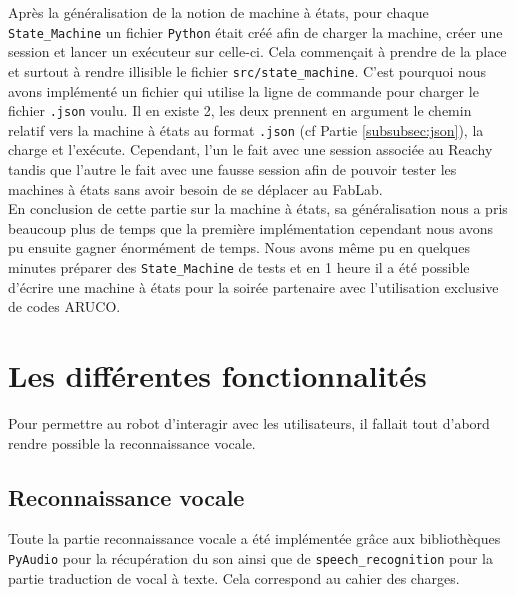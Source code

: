 \documentclass[a4paper,french]{article}
\begin{document}
Après la généralisation de la notion de machine à états, pour chaque \texttt{State\_Machine} un fichier \texttt{Python} était créé afin de charger la machine, créer une session et lancer un exécuteur sur celle-ci. Cela commençait à prendre de la place et surtout à rendre illisible le fichier \texttt{src/state\_machine}. C'est pourquoi nous avons implémenté un fichier qui utilise la ligne de commande pour charger le fichier \texttt{.json} voulu. Il en existe 2, les deux prennent en argument le chemin relatif vers la machine à états  au format \texttt{.json} (cf Partie \ref{subsubsec:json}), la charge et l'exécute. Cependant, l'un le fait avec une session associée au Reachy tandis que l'autre le fait avec une fausse session afin de pouvoir tester les machines à états sans avoir besoin de se déplacer au FabLab. \\

En conclusion de cette partie sur la machine à états, sa généralisation nous a pris beaucoup plus de temps que la première implémentation cependant nous avons pu ensuite gagner énormément de temps. Nous avons même pu en quelques minutes préparer des \texttt{State\_Machine} de tests et en 1 heure il a été possible d'écrire une machine à états pour la soirée partenaire avec l'utilisation exclusive de codes ARUCO.

\section{Les différentes fonctionnalités}
Pour permettre au robot d'interagir avec les utilisateurs, il fallait tout d'abord rendre possible la reconnaissance vocale.
\subsection{Reconnaissance vocale}

Toute la partie reconnaissance vocale a été implémentée grâce aux bibliothèques \texttt{PyAudio} pour la récupération du son ainsi que de \texttt{speech\_recognition} pour la partie traduction de vocal à texte. Cela correspond au cahier des charges.
\end{document}

